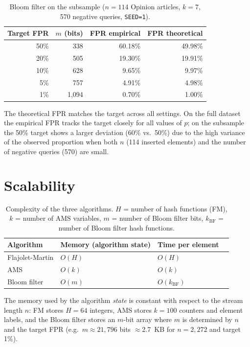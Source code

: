 \documentclass[11pt,a4paper]{article}
\begin{document}
\begin{table}[H]
\centering
\begin{tabular}{rrrr}
\toprule
Target FPR & $m$ (bits) & FPR empirical & FPR theoretical \\
\midrule
50\% &   338 & 60.18\% & 49.98\% \\
20\% &   505 & 19.30\% & 19.91\% \\
10\% &   628 &  9.65\% &  9.97\% \\
 5\% &   757 &  4.91\% &  4.98\% \\
 1\% & 1,094 &  0.70\% &  1.00\% \\
\bottomrule
\end{tabular}
\caption{Bloom filter on the subsample ($n=114$ Opinion articles, $k=7$,
  570 negative queries, \texttt{SEED=1}).}
\label{tab:bloom_subsample}
\end{table}

The theoretical FPR matches the target across all settings.
On the full dataset the empirical FPR tracks the target closely for all values of
$p$; on the subsample the 50\% target shows a larger deviation (60\% vs.\ 50\%)
due to the high variance of the observed proportion when both $n$ (114 inserted
elements) and the number of negative queries (570) are small.

\section{Scalability}

\begin{table}[H]
\centering
\begin{tabular}{llll}
\toprule
Algorithm & Memory (algorithm state) & Time per element  \\
\midrule
Flajolet-Martin  & $O(H)$ & $O(H)$ \\
AMS              & $O(k)$ & $O(k)$ \\
Bloom filter     & $O(m)$ & $O(k_{\mathrm{BF}})$ \\
\bottomrule
\end{tabular}
\caption{Complexity of the three algorithms. $H$ = number of hash functions (FM),
$k$ = number of AMS variables, $m$ = number of Bloom filter bits,
$k_{\mathrm{BF}}$ = number of Bloom filter hash functions. }
\label{tab:scalability}
\end{table}

The memory used by the algorithm \emph{state} is constant with respect to the stream
length $n$: FM stores $H = 64$ integers, AMS stores $k = 100$ counters and element
labels, and the Bloom filter stores an $m$-bit array where $m$ is determined by $n$
and the target FPR (e.g.\ $m \approx 21{,}796$ bits $\approx$2.7~KB for $n=2{,}272$
and target 1\%).
\end{document}
